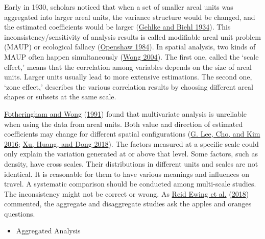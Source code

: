 \documentclass[
  12pt,
]{article}
\providecommand{\tightlist}{%
  \setlength{\itemsep}{0pt}\setlength{\parskip}{0pt}}
\begin{document}
Early in 1930, scholars noticed that when a set of smaller areal units was aggregated into larger areal units, the variance structure would be changed, and the estimated coefficients would be larger (\protect\hyperlink{ref-gehlkeCertainEffectsGrouping1934}{Gehlke and Biehl 1934}). This inconsistency/sensitivity of analysis results is called modifiable areal unit problem (MAUP) or ecological fallacy (\protect\hyperlink{ref-openshawEcologicalFallaciesAnalysis1984}{Openshaw 1984}). In spatial analysis, two kinds of MAUP often happen simultaneously (\protect\hyperlink{ref-wongModifiableArealUnit2004}{Wong 2004}). The first one, called the `scale effect,' means that the correlation among variables depends on the size of areal units. Larger units usually lead to more extensive estimations. The second one, `zone effect,' describes the various correlation results by choosing different areal shapes or subsets at the same scale.

\protect\hyperlink{ref-fotheringhamModifiableArealUnit1991}{Fotheringham and Wong} (\protect\hyperlink{ref-fotheringhamModifiableArealUnit1991}{1991}) found that multivariate analysis is unreliable when using the data from areal units. Both value and direction of estimated coefficients may change for different spatial configurations (\protect\hyperlink{ref-leeModifiableArealUnit2016}{G. Lee, Cho, and Kim 2016}; \protect\hyperlink{ref-xuModifiableArealUnit2018}{Xu, Huang, and Dong 2018}). The factors measured at a specific scale could only explain the variation generated at or above that level. Some factors, such as density, have cross scales. Their distributions in different units and scales are not identical. It is reasonable for them to have various meanings and influences on travel. A systematic comparison should be conducted among multi-scale studies. The inconsistency might not be correct or wrong. As \protect\hyperlink{ref-ewingTestingNewmanKenworthy2018}{Reid Ewing et al.} (\protect\hyperlink{ref-ewingTestingNewmanKenworthy2018}{2018}) commented, the aggregate and disaggregate studies ask the apples and oranges questions.

\begin{itemize}
\tightlist
\item
  Aggregated Analysis
\end{itemize}
\end{document}

